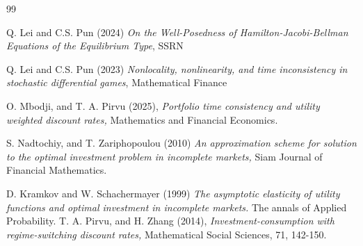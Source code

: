 \documentclass[11pt, psfig]{article}
\theoremstyle{definition}
\theoremstyle{remark}
\numberwithin{equation}{section}
\begin{document}
\begin{thebibliography}{99}








 Q. Lei and C.S. Pun (2024) \textit{On the Well-Posedness of Hamilton-Jacobi-Bellman Equations of the Equilibrium Type}, SSRN

 Q. Lei and C.S. Pun (2023) \textit{Nonlocality, nonlinearity, and time inconsistency in stochastic differential games}, Mathematical Finance



 O. Mbodji, and T. A. Pirvu (2025), \textit{ Portfolio time consistency and utility weighted discount rates,}
Mathematics and Financial Economics.

 S. Nadtochiy, and T. Zariphopoulou (2010) \textit{An approximation scheme for solution to the optimal investment problem in
incomplete markets,} Siam Journal of Financial Mathematics.

 D. Kramkov and W. Schachermayer (1999) \textit{ The asymptotic elasticity of utility functions and optimal investment in incomplete markets.} The annals of Applied Probability.
 T. A. Pirvu, and H. Zhang (2014),  \textit{Investment-consumption with regime-switching discount rates,} Mathematical Social Sciences, 71, 142-150.


\end{thebibliography}
\end{document}
